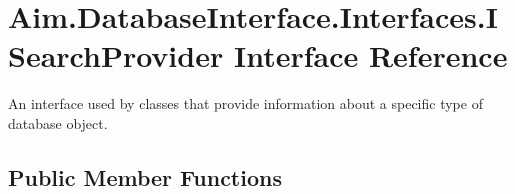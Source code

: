 \hypertarget{interface_aim_1_1_database_interface_1_1_interfaces_1_1_i_search_provider}{}\section{Aim.\+Database\+Interface.\+Interfaces.\+I\+Search\+Provider Interface Reference}
\label{interface_aim_1_1_database_interface_1_1_interfaces_1_1_i_search_provider}


An interface used by classes that provide information about a specific type of database object.  


\subsection*{Public Member Functions}
